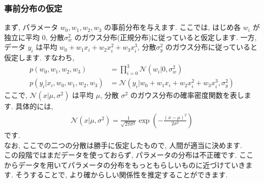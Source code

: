 \documentclass[b5paper,10pt]{jsarticle}
\begin{document}
\subsubsection{事前分布の仮定}
まず, パラメータ $w_0, w_1, w_2, w_3$ の事前分布を与えます. ここでは, はじめ各 $w_i$ が独立に平均 $0$, 分散$\sigma_w^2$ のガウス分布(正規分布)に従っていると仮定します. 
一方, データ $y_i$ は平均 $w_0 + w_1 x_i + w_2 x_i^2 + w_3 x_i^3$, 分散$\sigma_y^2$ のガウス分布に従っていると仮定します.  すなわち, 
\begin{align}
    p(w_0, w_1, w_2, w_3) &= \prod_{i=0}^3 \mathcal{N}(w_i | 0, \sigma_w^2) \label{eq:prior} \\
    p(y_i | x_i, w_0, w_1, w_2, w_3) &= \mathcal{N}(y_i | w_0 + w_1 x_i + w_2 x_i^2 + w_3 x_i^3, \sigma_y^2) \label{eq:likelihood}
\end{align}
ここで, $\mathcal{N}(x | \mu, \sigma^2)$ は平均 $\mu$, 分散 $\sigma^2$ のガウス分布の確率密度関数を表します. 具体的には, \\
\begin{align*}
    \mathcal{N}(x | \mu, \sigma^2) = \frac{1}{\sqrt{2\pi\sigma^2}} \exp\left(-\frac{(x - \mu)^2}{2\sigma^2}\right)
\end{align*}
です. \\
なお, ここでの二つの分散は勝手に仮定したもので, 人間が適当に決めます. \\
この段階ではまだデータを使っておらず, パラメータの分布は不正確です. ここからデータを用いてパラメータの分布をもっともらしいものに近づけていきます. そうすることで, より確からしい関係性を推定することができます. 
\end{document}
